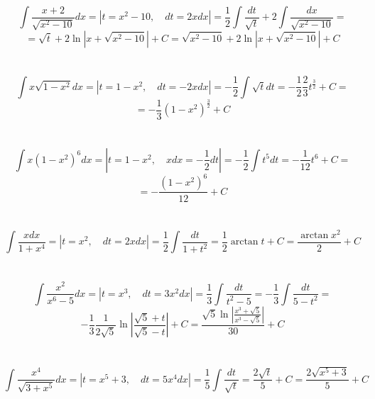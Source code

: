 \section{}
    \[\int \frac{x + 2}{\sqrt{x^2 - 10}} dx = \left|t = x^2 - 10, \quad
    dt = 2xdx \right| = \frac{1}{2} \int \frac{dt}{\sqrt{t}} + 2
    \int \frac{dx}{\sqrt{x^2 - 10}} =\]
    \[= \sqrt{t} + 2 \ln{|x + \sqrt{x^2 - 10}|} + C =
    \sqrt{x^2 - 10} + 2 \ln{|x + \sqrt{x^2 - 10}|} + C\]

\section{}
    \[\int x \sqrt{1 - x^2}dx = \left|t = 1 - x^2, \quad dt = -2xdx \right| =
    - \frac{1}{2} \int \sqrt{t}dt = - \frac{1}{2} \frac{2}{3} t^{\frac{3}{2}}
    + C =\]
    \[= - \frac{1}{3} (1 - x^2)^{\frac{3}{2}} + C\]
    
\section{}    
    \[\int x(1 - x^2)^6 dx = \left|t = 1 - x^2, \quad xdx = - \frac{1}{2}dt
    \right| = - \frac{1}{2} \int t^5 dt = - \frac{1}{12} t^6 + C =\]
    \[= - \frac{(1 - x^2)^6}{12} + C\]

\section{}
    \[\int \frac{xdx}{1 + x^4} = \left|t = x^2, \quad dt = 2xdx \right| =
    \frac{1}{2} \int \frac{dt}{1 + t^2} = \frac{1}{2} \arctan{t} + C =
    \frac{\arctan{x^2}}{2} + C\]    

\section{}
    \[\int \frac{x^2}{x^6 - 5}dx = \left|t = x^3, \quad dt = 3x^2dx
    \right| = \frac{1}{3} \int \frac{dt}{t^2 - 5} = - \frac{1}{3}
    \int \frac{dt}{5 - t^2} = \]
    \[- \frac{1}{3} \frac{1}{2\sqrt{5}} \ln{\left|
    \frac{\sqrt{5} + t}{\sqrt{5} - t} \right|} + C =
    \frac{\sqrt{5} \ln{\left|\frac{x^3 + \sqrt{5}}{x^3 - \sqrt{5}} 
    \right|}}{30} + C\]
    
\section{}
    \[\int \frac{x^4}{\sqrt{3 + x^5}}dx = \left|t = x^5 + 3, \quad
    dt = 5x^4dx \right| = \frac{1}{5} \int \frac{dt}{\sqrt{t}} =
    \frac{2\sqrt{t}}{5} + C = \frac{2\sqrt{x^5 + 3}}{5} + C\]   
    
